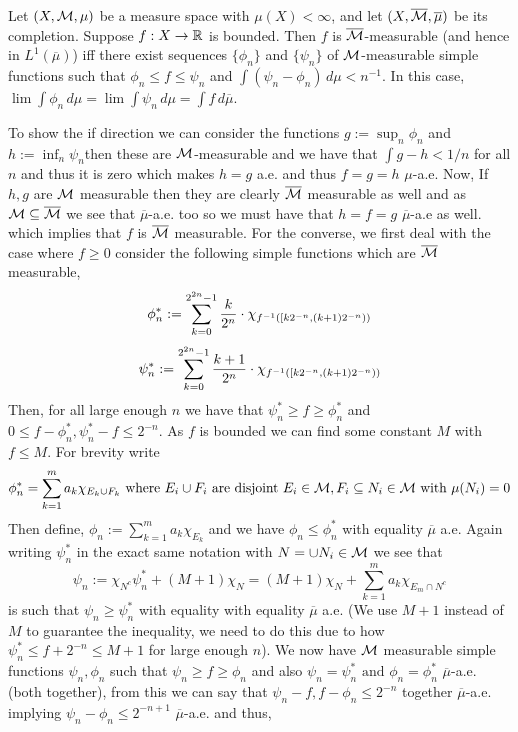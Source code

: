 \documentclass[12pt,a4paper]{article}
\begin{document}
\begin{problem}\label{prob:2-24}
Let $(X, \mathcal{M}, \mu)$ be a measure space with $\mu(X) < \infty$, and let $(X, \overline{\mathcal{M}}, \overline{\mu})$ be its completion. Suppose $f: X \to \mathbb{R}$ is bounded. Then $f$ is $\overline{\mathcal{M}}$-measurable (and hence in $L^1(\overline{\mu})$) iff there exist sequences $\{\phi_n\}$ and $\{\psi_n\}$ of $\mathcal{M}$-measurable simple functions such that $\phi_n \le f \le  \psi_n$ and $\int (\psi_n - \phi_n) \, d\mu < n^{-1}$. In this case, $\lim \int \phi_n \, d\mu = \lim \int \psi_n \, d\mu = \int f \, d\overline{\mu}$.
\end{problem}
\begin{solution}
To show the if direction we can consider the functions $g:=\sup_n\phi_n$ and $h:=\inf_n\psi_n$then these are $\mathcal{M}$-measurable and we have that $\int g-h<1/n$ for all $n$ and thus it is zero which makes $h=g$ a.e. and thus $f=g=h$ $\mu$-a.e. 
Now, If $h,g$ are $\mathcal{M}$ measurable then they are clearly $\overline{\mathcal{M}}$ measurable as well and as $\mathcal{M}\subseteq\overline{\mathcal{M}}$ we see that $\overline{\mu}$-a.e. too so we must have that $h=f=g$ $\overline{\mu}$-a.e as well. which implies that $f$ is $\overline{\mathcal{M}}$ measurable. For the converse, we first deal with the case where $f\geq 0$ consider the following simple functions which are $\overline{\mathcal{M}}$ measurable,
$$\phi_n^*:=\sum_{k=0}^{2^{2n}-1}\frac{k}{2^n}\cdot\chi_{f^{-1}\qty([k2^{-n},(k+1)2^{-n}))}$$
$$\psi_n^*:=\sum_{k=0}^{2^{2n}-1}\frac{k+1}{2^n}\cdot\chi_{f^{-1}\qty([k2^{-n},(k+1)2^{-n}))}$$
Then, for all large enough $n$ we have that $\psi_n^*\geq f\geq \phi_n^*$ and $0\leq f-\phi_n^*,\psi_n^*-f\leq 2^{-n}$. 
As $f$ is bounded we can find some constant $M$ with $f\leq M$. 
For brevity write
$$\phi_n^*=\sum_{k=1}^ma_k\chi_{E_k\cup F_k}\text{ where }E_i\cup F_i\text{ are disjoint }E_i\in\mathcal{M},F_i\subseteq N_i\in\mathcal{M}\text{ with }\mu(N_i)=0$$
Then define, $\phi_n:=\sum_{k=1}^ma_k\chi_{E_k}$ and we have $\phi_n\leq\phi_n^*$ with equality $\overline{\mu}$ a.e. Again writing $\psi_n^*$ in the exact same notation with $N=\cup N_i\in\mathcal{M}$ we see that 
$$\psi_n:=\chi_{N^c}\psi_n^*+(M+1)\chi_N=(M+1)\chi_N+\sum_{k=1}^ma_k\chi_{E_m\cap N^c}$$
is such that $\psi_n\geq\psi^*_n$ with equality with equality $\overline{\mu}$ a.e. (We use $M+1$ instead of $M$ to guarantee the inequality, we need to do this due to how $\psi_n^*\leq f+2^{-n}\leq M+1$ for large enough $n$). 
We now have $\mathcal{M}$ measurable simple functions $\psi_n,\phi_n$ such that $\psi_n\geq f\geq \phi_n$ and also $\psi_n=\psi^*_n\text{ and }\phi_n=\phi_n^*$ $\overline{\mu}$-a.e. (both together), from this we can say that $\psi_n-f,f-\phi_n\leq 2^{-n}$ together $\overline{\mu}$-a.e. implying $\psi_n-\phi_n\leq 2^{-n+1}$ $\overline{\mu}$-a.e. and thus,

\end{solution}
\end{document}

